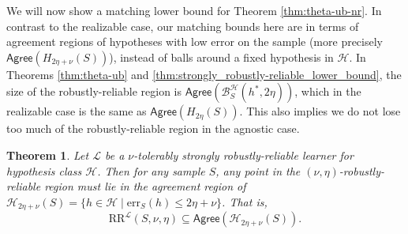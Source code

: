 \documentclass[11pt]{article}
\newcommand{\CR}{\text{RR}}
\newcommand{\err}{\mathrm{err}}
\newtheorem{theorem}{Theorem}[section]
\newcommand{\0}{\mathbf{0}}
\newcommand{\1}{\mathbf{1}}
\newcommand{\cB}{\mathcal{B}}
\newcommand{\cH}{\mathcal{H}}
\newcommand{\cL}{\mathcal{L}}
\newcommand{\Agree}{\mathsf{Agree}}
\begin{document}
We will now show a matching lower bound for Theorem \ref{thm:theta-ub-nr}. In contrast to the realizable case, our matching bounds here are in terms of agreement regions of hypotheses with low error on the sample (more precisely $\Agree\left(H_{2\eta+\nu}(S)\right)$), instead of balls around a fixed hypothesis in $\cH$. In Theorems \ref{thm:theta-ub} and \ref{thm:strongly_robustly-reliable_lower_bound}, the size of the robustly-reliable region is $\Agree\left(\cB_S^\cH(h^*,2\eta)\right)$, which in the realizable case is the same as $\Agree\left(H_{2\eta}(S)\right)$. This also implies we do not lose too much of the robustly-reliable region in the agnostic case.








\begin{theorem}
Let $\cL$ be a $\nu$-tolerably strongly robustly-reliable learner for hypothesis class $\cH$.  Then for any sample $S$, any point in the $(\nu,\eta)$-robustly-reliable region must lie in the agreement region of  $\cH_{2\eta+\nu}(S)=\{h \in \cH\mid \err_{S}(h)\le2\eta+\nu\}$. That is,
$$\CR^\cL(S,\nu,\eta) \subseteq \Agree\left(\cH_{2\eta+\nu}(S)\right).$$

\label{thm:strongly_robustly-reliable_lower_bound-nr}
\end{theorem}
\end{document}
